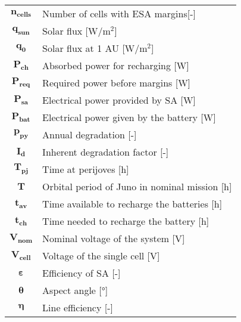 \begin{multicols}{2}
{\begin{xltabular}{\linewidth}{c>{\raggedright\arraybackslash}X}
		$\boldsymbol{n_{cells}}$ & Number of cells with ESA margins[-] \\
		$\boldsymbol{q_{sun}}$ & Solar flux [W/$\textrm{m}^2$] \\
		$\boldsymbol{q_{0}}$ & Solar flux at 1 AU [W/$\textrm{m}^2$] \\
		$\boldsymbol{P_{ch}}$ & Absorbed power for recharging [W] \\
		$\boldsymbol{P_{req}}$ & Required power before margins [W] \\
		$\boldsymbol{P_{sa}}$ & Electrical power provided by SA [W] \\
		$\boldsymbol{P_{bat}}$ & Electrical power given by the battery [W] \\
		$\boldsymbol{p_{py}}$ & Annual degradation [-] \\
		$\boldsymbol{I_{d}}$ & Inherent degradation factor [-] \\
		$\boldsymbol{T_{pj}}$ & Time at perijoves [h] \\
		$\boldsymbol{T}$ & Orbital period of Juno in nominal mission [h] \\
		$\boldsymbol{t_{av}}$ & Time available to recharge the batteries [h] \\
		$\boldsymbol{t_{ch}}$ & Time needed to recharge the battery [h] \\
		$\boldsymbol{V_{nom}}$ & Nominal voltage of the system [V] \\
		$\boldsymbol{V_{cell}}$ & Voltage of the single cell [V] \\
		$\boldsymbol{\varepsilon}$ & Efficiency of SA [-] \\
		$\boldsymbol{\theta}$ & Aspect angle [°] \\
		$\boldsymbol{\eta}$ &  Line efficiency [-]
 	\end{xltabular}
	\unskip
	\unpenalty
	\unpenalty}
	\unvbox\ltmcbox
\end{multicols}